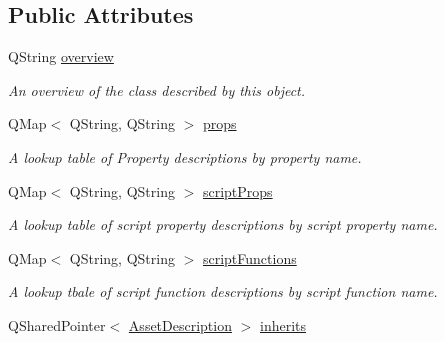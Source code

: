 \subsection*{Public Attributes}
\begin{DoxyCompactItemize}
\item 
\hypertarget{struct_asset_description_a8012b73caff741e24ef4b745dbe07fbd}{Q\-String \hyperlink{struct_asset_description_a8012b73caff741e24ef4b745dbe07fbd}{overview}}\label{struct_asset_description_a8012b73caff741e24ef4b745dbe07fbd}

\begin{DoxyCompactList}\small\item\em An overview of the class described by this object. \end{DoxyCompactList}\item 
\hypertarget{struct_asset_description_a1cf0e32a075f4a1994ceba72b8c6eb84}{Q\-Map$<$ Q\-String, Q\-String $>$ \hyperlink{struct_asset_description_a1cf0e32a075f4a1994ceba72b8c6eb84}{props}}\label{struct_asset_description_a1cf0e32a075f4a1994ceba72b8c6eb84}

\begin{DoxyCompactList}\small\item\em A lookup table of Property descriptions by property name. \end{DoxyCompactList}\item 
\hypertarget{struct_asset_description_ae6d797a83967ab5216a59a7ff6348083}{Q\-Map$<$ Q\-String, Q\-String $>$ \hyperlink{struct_asset_description_ae6d797a83967ab5216a59a7ff6348083}{script\-Props}}\label{struct_asset_description_ae6d797a83967ab5216a59a7ff6348083}

\begin{DoxyCompactList}\small\item\em A lookup table of script property descriptions by script property name. \end{DoxyCompactList}\item 
\hypertarget{struct_asset_description_ada48ba274357bcfdf8e8a2a246bb27e1}{Q\-Map$<$ Q\-String, Q\-String $>$ \hyperlink{struct_asset_description_ada48ba274357bcfdf8e8a2a246bb27e1}{script\-Functions}}\label{struct_asset_description_ada48ba274357bcfdf8e8a2a246bb27e1}

\begin{DoxyCompactList}\small\item\em A lookup tbale of script function descriptions by script function name. \end{DoxyCompactList}\item 
\hypertarget{struct_asset_description_a889354e2177a730d6785ea9fdb024b2f}{Q\-Shared\-Pointer$<$ \hyperlink{struct_asset_description}{Asset\-Description} $>$ \hyperlink{struct_asset_description_a889354e2177a730d6785ea9fdb024b2f}{inherits}}\label{struct_asset_description_a889354e2177a730d6785ea9fdb024b2f}


\end{DoxyCompactItemize}
